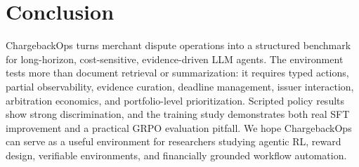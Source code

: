 \documentclass[11pt]{article}
\begin{document}
\section{Conclusion}

ChargebackOps turns merchant dispute operations into a structured benchmark for long-horizon, cost-sensitive, evidence-driven LLM agents. The environment tests more than document retrieval or summarization: it requires typed actions, partial observability, evidence curation, deadline management, issuer interaction, arbitration economics, and portfolio-level prioritization. Scripted policy results show strong discrimination, and the training study demonstrates both real SFT improvement and a practical GRPO evaluation pitfall. We hope ChargebackOps can serve as a useful environment for researchers studying agentic RL, reward design, verifiable environments, and financially grounded workflow automation.



\end{document}
